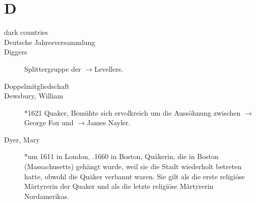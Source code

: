 \section*{D}

\articlesize

\begin{description}
 \item[dark countries]

 \item[Deutsche Jahresversammlung]

\item[Diggers] Splittergruppe der $\to$Levellers.

 \item[Doppelmitgliedschaft]

 \item[Dewsbury, William] $\ast$1621  Quaker, Bemühte sich ervolkreich um die Aussöhnung zwischen $\to$George Fox und $\to$James Nayler.

 \item[Dyer, Mary] $\ast$um 1611 in London, .1660 in Boston, Quäkerin, die in Boston (Massachusetts) gehängt wurde, weil sie die Stadt wiederholt betreten hatte, obwohl die Quäker verbannt waren. Sie gilt als die erste religiöse Märtyrerin der Quaker und als die letzte religiöse Märtyrerin Nordamerikas.

 \end{description}

\normalsize